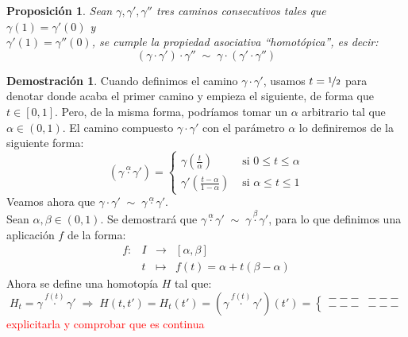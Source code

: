 \documentclass[12pt,twoside]{report}
\theoremstyle{azul}
\theoremstyle{azul2}
\theoremstyle{plain}
\newtheorem*{prop}{Proposición}
\theoremstyle{definition}
\newtheorem*{dem}{Demostración}
\theoremstyle{remark}
\begin{document}
\begin{prop}
Sean $\gamma, \gamma', \gamma''$ tres caminos consecutivos tales que $\gamma(1)=\gamma'(0)$ y \\ $\gamma'(1)=\gamma''(0)$, se cumple la propiedad asociativa ``homotópica'', es decir:
$$(\gamma \cdot \gamma') \cdot \gamma'' \; \sim \; \gamma \cdot (\gamma' \cdot \gamma'') $$\label{sec:9}
\end{prop}
\vspace{-13mm}
\begin{dem}
Cuando definimos el camino $\gamma \cdot \gamma'$, usamos $t=\nicefrac{1}{2}$ para denotar donde acaba el primer camino y empieza el siguiente, de forma que $t \in [0,1]$. Pero, de la misma forma, podríamos tomar un $\alpha$ arbitrario tal que $\alpha \in (0,1)$. El camino compuesto $\gamma \cdot \gamma'$ con el parámetro $\alpha$ lo definiremos de la siguiente forma:
$$(\gamma \overset{\alpha}{\cdot} \gamma') = \left\{\begin{array}{ll}
     \gamma(\frac{t}{\alpha}) & \text{ si } 0 \leq t \leq \alpha  \\
     \gamma' (\frac{t-\alpha}{1-\alpha}) & \text{ si } \alpha \leq t \leq 1
\end{array} \right.$$
Veamos ahora que $\gamma \cdot \gamma' \; \sim \; \gamma \overset{\alpha}{\cdot} \gamma'$. \\ 
Sean $\alpha, \beta \in (0,1)$. Se demostrará que $\gamma \overset{\alpha}{\cdot} \gamma' \; \sim \; \gamma \overset{\beta}{\cdot} \gamma'$, para lo que definimos una aplicación $f$ de la forma:
$$\begin{array}{rrcl}
     f : & I & \longrightarrow & [\alpha, \beta]  \\
     \;  & t & \longmapsto & f(t)=\alpha + t (\beta - \alpha)
\end{array}$$
Ahora se define una homotopía $H$ tal que:
$$H_t=\gamma \stackrel{f(t)}{\cdot} \gamma' \; \Rightarrow \; H(t,t') = H_t(t')=(\gamma \stackrel{f(t)}{\cdot} \gamma')(t')=\left\{ \begin{array}{ll}
     --- & --- \\
     --- & ---
\end{array}\right.$$
\textcolor{red}{ explicitarla y comprobar que es continua}


\end{dem}
\end{document}
